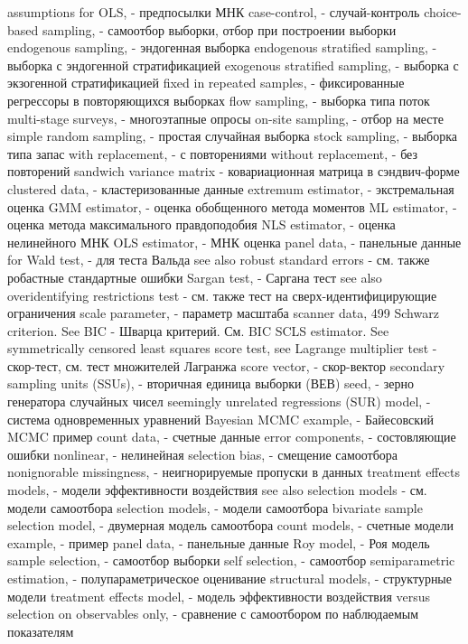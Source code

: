 assumptions for OLS, - предпосылки МНК
case-control, - случай-контроль
choice-based sampling, - самоотбор выборки, отбор при построении выборки
endogenous sampling, - эндогенная выборка
endogenous stratified sampling, - выборка с эндогенной стратификацией
exogenous stratified sampling, - выборка с экзогенной стратификацией
fixed in repeated samples,  - фиксированные регрессоры в повторяющихся выборках
flow sampling, - выборка типа поток
multi-stage surveys, - многоэтапные опросы
on-site sampling, - отбор на месте
simple random sampling, - простая случайная выборка
stock sampling, - выборка типа запас
with replacement, - с повторениями
without replacement, - без повторений
sandwich variance matrix - ковариационная матрица в сэндвич-форме
clustered data, - кластеризованные данные
extremum estimator, - экстремальная оценка
GMM estimator, - оценка обобщенного метода моментов
ML estimator, - оценка метода максимального правдоподобия
NLS estimator, - оценка нелинейного МНК
OLS estimator, - МНК оценка
panel data, - панельные данные
for Wald test, - для теста Вальда
see also robust standard errors - см. также робастные стандартные ошибки
Sargan test, - Саргана тест
see also overidentifying restrictions test - см. также тест на сверх-идентифицирующие ограничения
scale parameter, - параметр масштаба
scanner data, 499
Schwarz criterion. See BIC - Шварца критерий. См. BIC
SCLS estimator. See symmetrically censored least squares
score test, see Lagrange multiplier test - скор-тест, см. тест множителей Лагранжа
score vector, - скор-вектор
secondary sampling units (SSUs), - вторичная единица выборки (ВЕВ)
seed, - зерно генератора случайных чисел 
seemingly unrelated regressions (SUR) model, - система одновременных уравнений
Bayesian MCMC example, - Байесовский MCMC пример
count data, - счетные данные
error components, - состовляющие ошибки
nonlinear, - нелинейная
selection bias, - смещение самоотбора
nonignorable missingness, - неигнорируемые пропуски в данных
treatment effects models, - модели эффективности воздействия
see also selection models - см. модели самоотбора
selection models, - модели самоотбора
bivariate sample selection model, - двумерная модель самоотбора
count models, - счетные модели
example, - пример
panel data, - панельные данные
Roy model, - Роя модель
sample selection, - самоотбор выборки
self selection, - самоотбор
semiparametric estimation, - полупараметрическое оценивание
structural models, - структурные модели
treatment effects model, - модель эффективности воздействия
versus selection on observables only, - сравнение с самоотбором по наблюдаемым показателям
